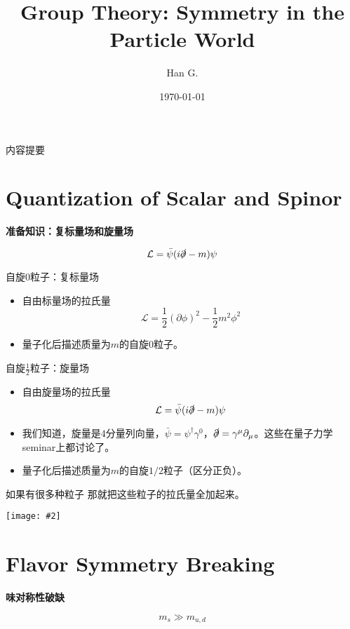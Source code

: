 \documentclass[aspectratio=1610,14pt,mathserif]{beamer}
\title{Group Theory: Symmetry in the Particle World}
\author{Han G.}
\date{\today}
\newcommand{\bch}{}
\newcommand{\ech}{}
\def\bcenter{\begin{center}}
\def\ecenter{\end{center}}
\def\skipline{{\vskip0.1in}}
\def\tbox#1{\begin{tcolorbox}#1\end{tcolorbox}}
\newcommand{\lag}{\mathcal{L}}
\def\secpage#1#2{\begin{frame}\bch\bcenter{\bf \Huge #1} \skipline \tbox{#2}\ecenter\ech\end{frame}}
\newcommand{\cpic}[2]{
\begin{center}
\texttt{[image: \#2]}
\end{center}
}
\begin{document}
\begin{frame}
 
\titlepage

\end{frame}

\begin{frame}{内容提要}
\tableofcontents
\end{frame}

\section{Quantization of Scalar and Spinor}
\secpage{准备知识：复标量场和旋量场}{$$\lag = \bar{\psi}(i\slashed{\partial}-m)\psi$$}

\begin{frame}{自旋$0$粒子：复标量场}
\begin{itemize}
\item 自由标量场的拉氏量
$$
\lag = \frac{1}{2}(\partial \phi)^2 - \frac{1}{2}m^2 \phi^2
$$
\item 量子化后描述质量为$m$的自旋$0$粒子。
\end{itemize}
\end{frame}

\begin{frame}{自旋$\frac{1}{2}$粒子：旋量场}
\begin{itemize}
\item 自由旋量场的拉氏量
$$
\lag =  \bar{\psi}(i\slashed{\partial}-m)\psi
$$
\item
我们知道，旋量是$4$分量列向量，$\bar{\psi} =\psi^\dagger \gamma^0 $，$\slashed{\partial} = \gamma^\mu \partial_\mu$。这些在量子力学seminar上都讨论了。
\item 量子化后描述质量为$m$的自旋$1/2$粒子（区分正负）。
\end{itemize}
\end{frame}


\begin{frame}{如果有很多种粒子}
那就把这些粒子的拉氏量全加起来。
\cpic{0.4}{happy}
\end{frame}


\section{Flavor Symmetry Breaking}
\secpage{味对称性破缺}{$$m_s \gg m_{u,d}$$}
\end{document}

